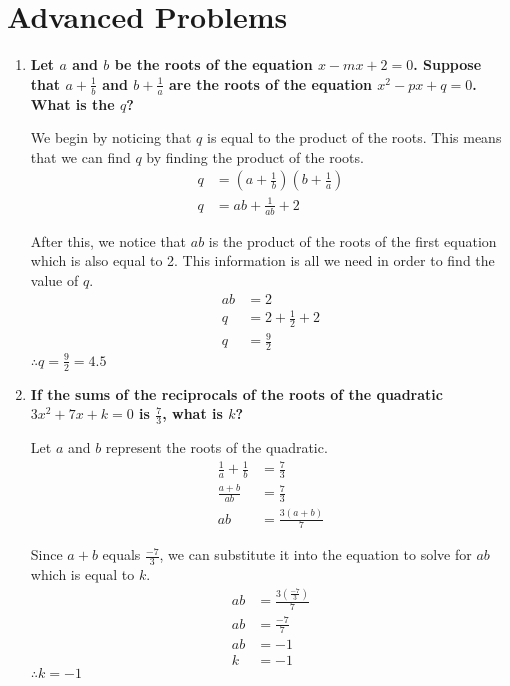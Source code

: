 \documentclass[12pt]{article}
\begin{document}
\section*{Advanced Problems}
\begin{enumerate}
    \item \textbf{Let $a$ and $b$ be the roots of the equation $x - mx + 2 = 0$. Suppose that $a + \frac{1}{b}$  and $b + \frac{1}{a}$ are the roots of the equation $x^2 - px + q = 0$. What is the $q$?}
    
    We begin by noticing that $q$ is equal to the product of the roots. This means that we can find $q$ by finding the product of the roots.
    \begin{align*}
        q&=(a+\frac{1}{b})(b+\frac{1}{a}) \\
        q&=ab+\frac{1}{ab}+2
    \end{align*}
    
    After this, we notice that $ab$ is the product of the roots of the first equation which is also equal to 2. This information is all we need in order to find the value of $q$.
    \begin{align*}
        ab&=2 \\
        q&=2+\frac{1}{2}+2 \\
        q&=\frac{9}{2}
    \end{align*}
    $\therefore q=\frac{9}{2}=4.5$
    
    \item \textbf{If the sums of the reciprocals of the roots of the quadratic $3x^2 + 7x + k = 0$ is $\frac{7}{3}$, what is $k$? }
    
    Let $a$ and $b$ represent the roots of the quadratic.
    \begin{align*}
        \frac{1}{a}+\frac{1}{b}&=\frac{7}{3} \\
        \frac{a+b}{ab}&=\frac{7}{3} \\
        ab&=\frac{3(a+b)}{7}
    \end{align*}
    
    Since $a+b$ equals $\frac{-7}{3}$, we can substitute it into the equation to solve for $ab$ which is equal to $k$.
    \begin{align*}
        ab&=\frac{3(\frac{-7}{3})}{7} \\
        ab&=\frac{-7}{7} \\
        ab&=-1 \\
        k&=-1
    \end{align*}
    $\therefore k=-1$
    
\end{enumerate}
\end{document}
